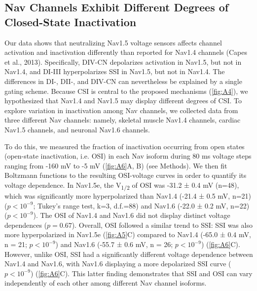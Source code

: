 \subsection{Nav Channels Exhibit Different Degrees of Closed-State Inactivation}
Our data shows that neutralizing Nav1.5 voltage sensors affects channel activation and inactivation differently than reported for Nav1.4 channels (Capes et al., 2013). Specifically, DIV-CN depolarizes activation in Nav1.5, but not in Nav1.4, and DI-III hyperpolarizes SSI in Nav1.5, but not in Nav1.4. The differences in DI-, DII-, and DIV-CN can nevertheless be explained by a single gating scheme. Because CSI is central to the proposed mechanisms (\autoref{fig:A4}), we hypothesized that Nav1.4 and Nav1.5 may display different degrees of CSI. To explore variation in inactivation among Nav channels, we collected data from three different Nav channels: namely, skeletal muscle Nav1.4 channels, cardiac Nav1.5 channels, and neuronal Nav1.6 channels. 

To do this, we measured the fraction of inactivation occurring from open states (open-state inactivation, i.e. OSI) in each Nav isoform during 80 ms voltage steps ranging from -160 mV to -5 mV (\autoref{fig:A6}A, B) (see Methods). We then fit Boltzmann functions to the resulting OSI-voltage curves in order to quantify its voltage dependence. In Nav1.5e, the V\textsubscript{1/2} of OSI was -31.2 ± 0.4 mV (n=48), which was significantly more hyperpolarized than Nav1.4 (-21.4 ± 0.5 mV, n=21) ($p < 10^{-9}$; Tukey’s range test, k=3, d.f.=88) and Nav1.6 (-22.0 ± 0.2 mV, n=22) ($p < 10^{-9}$). The OSI of Nav1.4 and Nav1.6 did not display distinct voltage dependences ($p=0.67$). Overall, OSI followed a similar trend to SSI: SSI was also more hyperpolarized in Nav1.5e (\autoref{fig:A5}C) compared to Nav1.4 (-65.0 ± 0.4 mV, n = 21; $p < 10^{-9}$) and Nav1.6 (-55.7 ± 0.6 mV, n = 26; $p < 10^{-9}$) (\autoref{fig:A6}C). However, unlike OSI, SSI had a significantly different voltage dependence between Nav1.4 and Nav1.6, with Nav1.6 displaying a more depolarized SSI curve ($p<10^{-9}$) (\autoref{fig:A6}C). This latter finding demonstrates that SSI and OSI can vary independently of each other among different Nav channel isoforms. 

